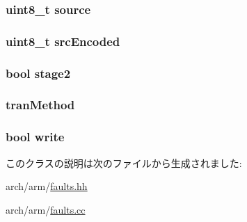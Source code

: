 \label{classArmISA_1_1AbortFault_ad135724e922a94add62100a64854ae84}
\hypertarget{classArmISA_1_1AbortFault_a36a99c772ae64e186f5264a662834eef}{
\subsubsection[{source}]{\setlength{\rightskip}{0pt plus 5cm}uint8\_\-t {\bf source}}}
\label{classArmISA_1_1AbortFault_a36a99c772ae64e186f5264a662834eef}
\hypertarget{classArmISA_1_1AbortFault_ada7b52f73921c795a241ffd6e381fc69}{
\subsubsection[{srcEncoded}]{\setlength{\rightskip}{0pt plus 5cm}uint8\_\-t {\bf srcEncoded}}}
\label{classArmISA_1_1AbortFault_ada7b52f73921c795a241ffd6e381fc69}
\hypertarget{classArmISA_1_1AbortFault_a29056d47d3f3a94a388d6f9ba707ef0e}{
\subsubsection[{stage2}]{\setlength{\rightskip}{0pt plus 5cm}bool {\bf stage2}}}
\label{classArmISA_1_1AbortFault_a29056d47d3f3a94a388d6f9ba707ef0e}
\hypertarget{classArmISA_1_1AbortFault_a8f7a9c6fc85261a8c7ffb21d5afeed24}{
\subsubsection[{tranMethod}]{ {\bf tranMethod}}}
\label{classArmISA_1_1AbortFault_a8f7a9c6fc85261a8c7ffb21d5afeed24}
\hypertarget{classArmISA_1_1AbortFault_ab4d8d1259f524270d625ab8933700d27}{
\subsubsection[{write}]{\setlength{\rightskip}{0pt plus 5cm}bool {\bf write}}}
\label{classArmISA_1_1AbortFault_ab4d8d1259f524270d625ab8933700d27}


このクラスの説明は次のファイルから生成されました:\begin{DoxyCompactItemize}
\item 
arch/arm/\hyperlink{arch_2arm_2faults_8hh}{faults.hh}\item 
arch/arm/\hyperlink{arch_2arm_2faults_8cc}{faults.cc}\end{DoxyCompactItemize}
